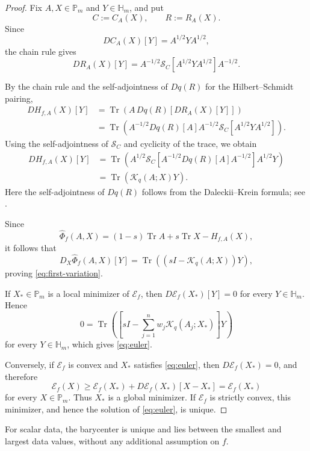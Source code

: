 \documentclass[11pt]{amsart}
\theoremstyle{definition}
\theoremstyle{remark}
\newcommand{\Pm}{\mathbb P_m}
\newcommand{\Hm}{\mathbb H_m}
\newcommand{\Tr}{\operatorname{Tr}}
\newcommand{\altPhi}{\widehat{\Phi}}
\begin{document}
 \begin{proof}
		Fix $A,X\in\Pm$ and $Y\in\Hm$, and put
		\[
		C:=C_A(X),\qquad R:=R_A(X).
		\]
		Since
		\[
		DC_A(X)[Y]=A^{1/2}YA^{1/2},
		\]
		the chain rule gives
		\[
		DR_A(X)[Y]
		=A^{-1/2}\mathcal S_C
		[A^{1/2}YA^{1/2}]A^{-1/2}.
		\]
		
		By the chain rule and the self-adjointness of $Dq(R)$ for the
		Hilbert--Schmidt pairing,
		\begin{align*}
			DH_{f,A}(X)[Y]
			&=\Tr\!\left(A\,Dq(R)[DR_A(X)[Y]]\right)\\
			&=\Tr\!\left(
			A^{-1/2}Dq(R)[A]A^{-1/2}
			\mathcal S_C[A^{1/2}YA^{1/2}]
			\right).
		\end{align*}
		Using the self-adjointness of $\mathcal S_C$ and cyclicity of the
		trace, we obtain
		\begin{align*}
			DH_{f,A}(X)[Y]
			&=\Tr\!\left(
			A^{1/2}\mathcal S_C\!\left[
			A^{-1/2}Dq(R)[A]A^{-1/2}
			\right]A^{1/2}Y
			\right)\\
			&=\Tr\!\left(\mathcal K_q(A;X)Y\right).
		\end{align*}
		Here the self-adjointness of $Dq(R)$ follows from the
		Daleckii--Krein formula; see \cite[Chapter~3]{Higham2008}.
		
		Since
		\[
		\altPhi_f(A,X)
		=(1-s)\Tr A+s\Tr X-H_{f,A}(X),
		\]
		it follows that
		\[
		D_X\altPhi_f(A,X)[Y]
		=\Tr\!\left((sI-\mathcal K_q(A;X))Y\right),
		\]
		proving \eqref{eq:first-variation}.
		
		If $X_*\in\Pm$ is a local minimizer of $\mathcal E_f$, then
		$D\mathcal E_f(X_*)[Y]=0$ for every $Y\in\Hm$.  Hence
		\[
		0
		=\Tr\!\left(
		\left[
		sI-\sum_{j=1}^n w_j\mathcal K_q(A_j;X_*)
		\right]Y
		\right)
		\]
		for every $Y\in\Hm$, which gives \eqref{eq:euler}.
		
		Conversely, if $\mathcal E_f$ is convex and $X_*$ satisfies
		\eqref{eq:euler}, then $D\mathcal E_f(X_*)=0$, and therefore
		\[
		\mathcal E_f(X)
		\ge\mathcal E_f(X_*)
		+D\mathcal E_f(X_*)[X-X_*]
		=\mathcal E_f(X_*)
		\]
		for every $X\in\Pm$.  Thus $X_*$ is a global minimizer.  If
		$\mathcal E_f$ is strictly convex, this minimizer, and hence the
		solution of \eqref{eq:euler}, is unique.
\end{proof}
	
For scalar data, the barycenter is unique and lies between the smallest and
largest data values, without any additional assumption on $f$.
\end{document}
